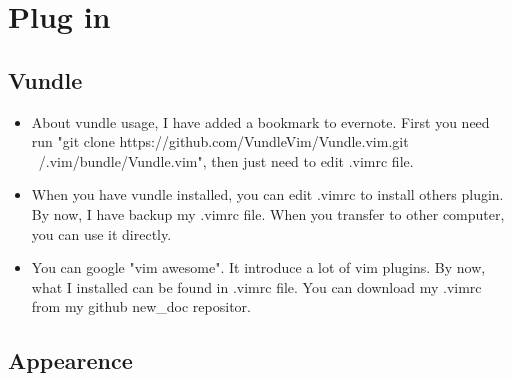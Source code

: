 \documentclass[paper=8.5in:11in, twoside, 12pt, pagesize=pdftex]{book}
\begin{document}
	\section{Plug in}
	
	\subsection{Vundle}
	\begin{itemize}
		\item About vundle usage, I have added a bookmark to evernote. First you need run "git clone https://github.com/VundleVim/Vundle.vim.git ~/.vim/bundle/Vundle.vim", then just need to edit .vimrc file.  
		
		\item When you have vundle installed, you can edit .vimrc to install others plugin. By now, I have backup my .vimrc file. When you transfer to other computer, you can use it directly. 
		
		\item You can google "vim awesome". It introduce a lot of vim plugins. By now, what I installed can be found in .vimrc file. You can download my .vimrc from my github new\_doc repositor.
	\end{itemize}
	
	\subsection{Appearence}
\end{document}

